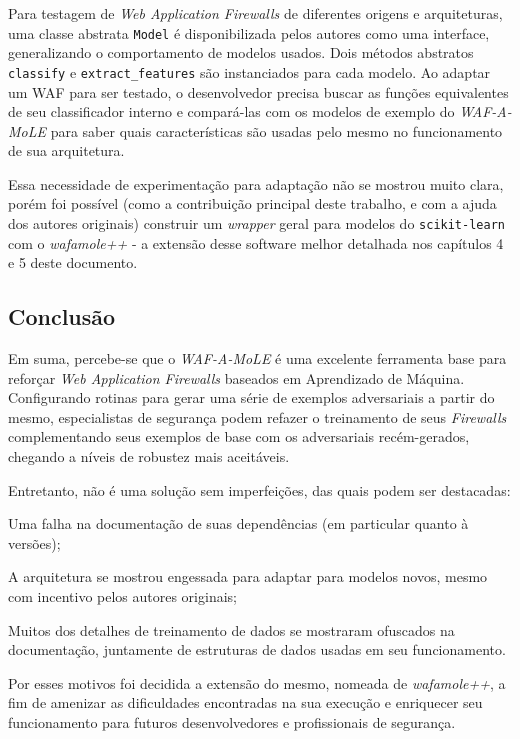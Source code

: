 \bigskip

Para testagem de \textit{Web Application Firewalls} de diferentes origens e arquiteturas, uma classe abstrata \verb+Model+ é disponibilizada pelos autores como uma interface, generalizando o comportamento de modelos usados. Dois métodos abstratos \verb+classify+ e \verb+extract_features+ são instanciados para cada modelo. Ao adaptar um WAF para ser testado, o desenvolvedor precisa buscar as funções equivalentes de seu classificador interno e compará-las com os modelos de exemplo do \textit{WAF-A-MoLE} para saber quais características são usadas pelo mesmo no funcionamento de sua arquitetura.

Essa necessidade de experimentação para adaptação não se mostrou muito clara, porém foi possível (como a contribuição principal deste trabalho, e com a ajuda dos autores originais) construir um \textit{wrapper} geral para modelos do \verb+scikit-learn+ com o \textit{wafamole++} - a extensão desse software melhor detalhada nos capítulos 4 e 5 deste documento.

\subsection{Conclusão}
Em suma, percebe-se que o \textit{WAF-A-MoLE} é uma excelente ferramenta base para reforçar \textit{Web Application Firewalls} baseados em Aprendizado de Máquina. Configurando rotinas para gerar uma série de exemplos adversariais a partir do mesmo, especialistas de segurança podem refazer o treinamento de seus \textit{Firewalls} complementando seus exemplos de base com os adversariais recém-gerados, chegando a níveis de robustez mais aceitáveis. 

Entretanto, não é uma solução sem imperfeições, das quais podem ser destacadas:
\begin{alineas}
\item Uma falha na documentação de suas dependências (em particular quanto à versões);
\item A arquitetura se mostrou engessada para adaptar para modelos novos, mesmo com incentivo pelos autores originais;
\item Muitos dos detalhes de treinamento de dados se mostraram ofuscados na documentação, juntamente de estruturas de dados usadas em seu funcionamento.
\end{alineas}

Por esses motivos foi decidida a extensão do mesmo, nomeada de \textit{wafamole++}, a fim de amenizar as dificuldades encontradas na sua execução e enriquecer seu funcionamento para futuros desenvolvedores e profissionais de segurança.


